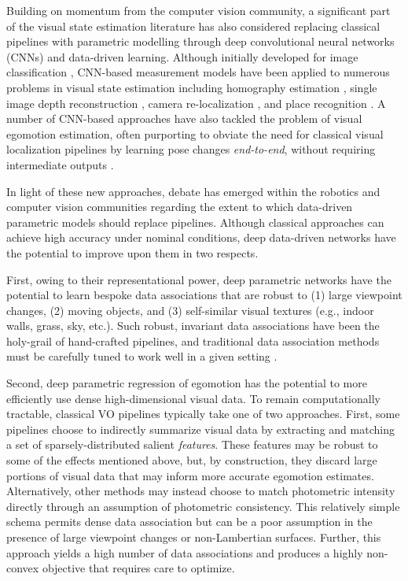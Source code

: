 Building on momentum from the computer vision community, a significant part of the visual state estimation literature has also considered replacing classical pipelines with parametric modelling through deep convolutional neural networks (CNNs) and data-driven learning. Although initially developed for image classification \citep{LeCun2015-qf}, CNN-based measurement models have been applied to numerous problems in visual state estimation including homography estimation \citep{DeTone2016-ue}, single image depth reconstruction \citep{Garg2016-ip},  camera re-localization \citep{Kendall2016-zf}, and place recognition \citep{Sunderhauf2015-is}. A number of CNN-based approaches have also tackled the problem of visual egomotion estimation, often purporting to obviate the need for classical visual localization pipelines by learning pose changes \textit{end-to-end}, without requiring intermediate outputs \citep{Melekhov2017-dl, Handa2016-hm, Oliveira2017-lt}.

In light of these new approaches, debate has emerged within the robotics and computer vision communities regarding the extent to which data-driven parametric models should replace pipelines. Although classical approaches can achieve high accuracy under nominal conditions, deep data-driven networks have the potential to improve upon them in two respects.

First, owing to their representational power, deep parametric networks have the potential to learn bespoke data associations that are robust to (1) large viewpoint changes, (2) moving objects, and (3) self-similar visual textures (e.g., indoor walls, grass, sky, etc.). Such robust, invariant data associations have been the holy-grail of hand-crafted pipelines, and traditional data association methods must be carefully tuned to work well in a given setting \citep{schonberger_comparative_2017}.

Second, deep parametric regression of egomotion has the potential to more efficiently use dense high-dimensional visual data. To remain computationally tractable, classical VO pipelines typically take one of two approaches.  First, some pipelines \citep{Leutenegger2015-fk,Cvisic2015-mt} choose to indirectly summarize visual data by extracting and matching a set of sparsely-distributed salient \textit{features}. These features may be robust to some of the effects mentioned above, but, by construction, they discard large portions of visual data that may inform more accurate egomotion estimates. Alternatively, other methods \citep{forster2014svo, wang_stereo_2017,  engel_direct_2018} may instead choose to match photometric intensity directly through an assumption of photometric consistency. This relatively simple schema permits dense data association but can be a poor assumption in the presence of large viewpoint changes or non-Lambertian surfaces. Further, this approach yields a high number of data associations and produces a highly non-convex objective that requires care to optimize. 


